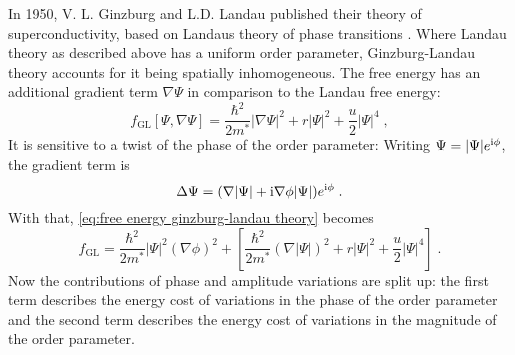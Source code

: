 \documentclass[../main.tex]{subfiles}
\begin{document}
In 1950, V. L. Ginzburg and L.D. Landau published their theory of superconductivity, based on Landaus theory of phase transitions \cite{ginzburgTheorySuperconductivity1950}.
Where Landau theory as described above has a uniform order parameter, Ginzburg-Landau theory accounts for it being spatially inhomogeneous.
The free energy has an additional gradient term \(\nabla \Psi\) in comparison to the Landau free energy:
\begin{equation}
	f_{\mathrm{GL}} [\Psi, \nabla \Psi] = \frac{\hbar^2}{2m^*} \vert \nabla \Psi \vert^2 + r \vert \Psi \vert^2 + \frac{u}{2} \vert \Psi \vert^4 \;,
	\label{eq:free energy ginzburg-landau theory}
\end{equation}
It is sensitive to a twist of the phase of the order parameter:
Writing \(\Psi = \vert \Psi \vert e^{\mathrm{i} \phi}\), the gradient term is
\begin{equation}
	\Delta \Psi = (\nabla \vert \Psi \vert + \mathrm{i} \nabla \phi \vert \Psi \vert) e^{\mathrm{i} \phi} \;.
\end{equation}
With that, \cref{eq:free energy ginzburg-landau theory} becomes
\begin{equation}
	f_{\mathrm{GL}}  = \frac{\hbar^2}{2m^*} \vert \Psi \vert^2 (\nabla \phi)^2 + \left[ \frac{\hbar^2}{2m^*} (\nabla \vert \Psi \vert)^2 + r \vert \Psi \vert^2 + \frac{u}{2} \vert \Psi \vert^4 \right] \;.
	\label{eq:free energy ginzburg-landau theory with phase}
\end{equation}
Now the contributions of phase and amplitude variations are split up: the first term describes the energy cost of variations in the phase of the order parameter and the second term describes the energy cost of variations in the magnitude of the order parameter.
\end{document}
